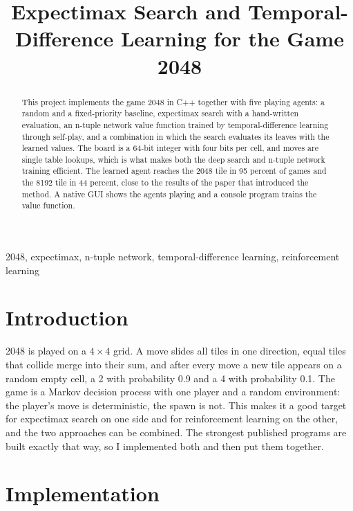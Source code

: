 \documentclass[conference]{IEEEtran}
\begin{document}
\title{Expectimax Search and Temporal-Difference Learning for the Game 2048}

\author{
}

\maketitle

\begin{abstract}
This project implements the game 2048 in C++ together with five playing agents: a random and a fixed-priority baseline, expectimax search with a hand-written evaluation, an n-tuple network value function trained by temporal-difference learning through self-play, and a combination in which the search evaluates its leaves with the learned values. The board is a 64-bit integer with four bits per cell, and moves are single table lookups, which is what makes both the deep search and n-tuple network training efficient. The learned agent reaches the 2048 tile in 95 percent of games and the 8192 tile in 44 percent, close to the results of the paper that introduced the method. A native GUI shows the agents playing and a console program trains the value function.
\end{abstract}

\begin{IEEEkeywords}
2048, expectimax, n-tuple network, temporal-difference learning, reinforcement learning
\end{IEEEkeywords}

\section{Introduction}
2048 is played on a $4\times4$ grid. A move slides all tiles in one direction, equal tiles that collide merge into their sum, and after every move a new tile appears on a random empty cell, a 2 with probability 0.9 and a 4 with probability 0.1. The game is a Markov decision process with one player and a random environment: the player's move is deterministic, the spawn is not. This makes it a good target for expectimax search on one side and for reinforcement learning on the other, and the two approaches can be combined. The strongest published programs\cite{b1,b2} are built exactly that way, so I implemented both and then put them together.

\section{Implementation}
\end{document}
